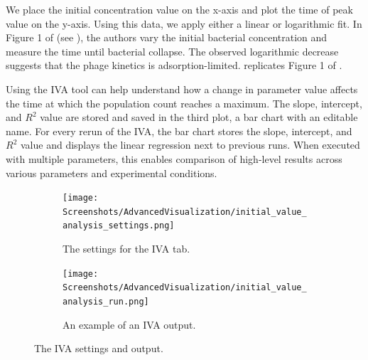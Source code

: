 We place the initial concentration value on the x-axis and plot the time of peak value on the y-axis. 
Using this data, we apply either a linear or logarithmic fit.
In Figure 1 of \citet{mullaExtremeDiversityPhage2024} (see ), the authors vary the initial bacterial concentration and measure the time until bacterial collapse. 
The observed logarithmic decrease suggests that the phage kinetics is adsorption-limited. 
 replicates Figure 1 of \citet{mullaExtremeDiversityPhage2024}. 

Using the IVA tool can help understand how a change in parameter value affects the time at which the population count reaches a maximum.
The slope, intercept, and $R^2$ value are stored and saved in the third plot, a bar chart with an editable name. 
For every rerun of the IVA, the bar chart stores the slope, intercept, and $R^2$ value and displays the linear regression next to previous runs. 
When executed with multiple parameters, this enables comparison of high-level results across various parameters and experimental conditions.

\begin{figure}[h!]
    \centering
    \begin{subfigure}{0.49\linewidth}
        \centering
        \captionsetup{width=1\linewidth}
        \texttt{[image: Screenshots/AdvancedVisualization/initial\_value\_analysis\_settings.png]}
        \caption{
            The settings for the IVA tab. 
        }
        \label{fig:ss:av:initial_value_analysis_settings}
        \vspace*{\fill}
    \end{subfigure}
    \hfill
    \begin{subfigure}{0.49\linewidth}
        \centering
        \captionsetup{width=1\linewidth}
        \texttt{[image: Screenshots/AdvancedVisualization/initial\_value\_analysis\_run.png]}
        \caption{
            An example of an IVA output. 
        }
        \label{fig:ss:av:initial_value_analysis_run}
        \vspace*{\fill}
    \end{subfigure}
    \caption{The IVA settings and output. }
\end{figure}


